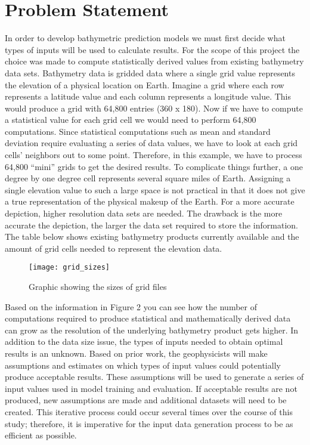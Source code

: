\section{Problem Statement}
In order to develop bathymetric prediction models we must first decide what types of inputs will be used to calculate results. 
For the scope of this project the choice was made to compute statistically derived values from existing bathymetry data sets. 
Bathymetry data is gridded data where a single grid value represents the elevation of a physical location on Earth. 
Imagine a grid where each row represents a latitude value and each column represents a longitude value. 
This would produce a grid with 64,800 entries (360 x 180). 
Now if we have to compute a statistical value for each grid cell we would need to perform 64,800 computations. 
Since statistical computations such as mean and standard deviation require evaluating a series of data values, we have to look at each grid cells’ neighbors out to some point. 
Therefore, in this example, we have to process 64,800 “mini” grids to get the desired results. 
To complicate things further, a one degree by one degree cell represents several square miles of Earth. 
Assigning a single elevation value to such a large space is not practical in that it does not give a true representation of the physical makeup of the Earth. 
For a more accurate depiction, higher resolution data sets are needed. 
The drawback is the more accurate the depiction, the larger the data set required to store the information. 
The table below shows existing bathymetry products currently available and the amount of grid cells needed to represent the elevation data.

\begin{figure}[h]
    \centering
    \texttt{[image: grid\_sizes]}
    \caption{Graphic showing the sizes of grid files}
    \label{fig2:Figure 2}
\end{figure}

\par
Based on the information in Figure 2 you can see how the number of computations required to produce statistical and mathematically derived data can grow as the resolution of the underlying bathymetry product gets higher.
In addition to the data size issue, the types of inputs needed to obtain optimal results is an unknown. 
Based on prior work, the geophysicists will make assumptions and estimates on which types of input values could potentially produce acceptable results. 
These assumptions will be used to generate a series of input values used in model training and evaluation. 
If acceptable results are not produced, new assumptions are made and additional datasets will need to be created. 
This iterative process could occur several times over the course of this study; therefore, it is imperative for the input data generation process to be as efficient as possible.

